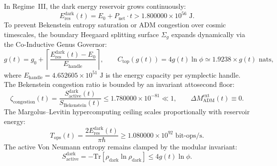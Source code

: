 \documentclass[11pt,onecolumn]{article}
\begin{document}
In Regime~III, the dark energy reservoir grows continuously:
\begin{equation}
E_{\text{res}}^{\text{dark}}(t) = E_0 + P_{\text{net}} \cdot t > 1.800000 \times 10^{56}\text{ J}.
\label{eq:v8_16}
\end{equation}
To prevent Bekenstein entropy saturation or ADM congestion over cosmic timescales, the boundary Heegaard splitting surface $\Sigma_g$ expands dynamically via the Co-Inductive Genus Governor:
\begin{equation}
g(t) = g_0 + \left\lceil \frac{E_{\text{res}}^{\text{dark}}(t) - E_0}{E_{\text{handle}}} \right\rceil, \qquad C_{\text{top}}(g(t)) = 4g(t)\ln\phi \simeq 1.9238 \times g(t)\text{ nats},
\label{eq:v8_17}
\end{equation}
where $E_{\text{handle}} = 4.652605 \times 10^{51}\text{ J}$ is the energy capacity per symplectic handle. The Bekenstein congestion ratio is bounded by an invariant attosecond floor:
\begin{equation}
\zeta_{\text{congestion}}(t) = \frac{S_{\text{active}}^{\text{dark}}(t)}{S_{\text{Bekenstein}}(t)} \le 1.780000 \times 10^{-81} \ll 1, \qquad \Delta M_{\text{ADM}}^{\text{ext}}(t) \equiv 0.
\label{eq:v8_18}
\end{equation}
The Margolus--Levitin hypercomputing ceiling scales proportionally with reservoir energy:
\begin{equation}
T_{\text{ops}}(t) = \frac{2 E_{\text{res}}^{\text{dark}}(t)}{\pi \hbar} \ge 1.080000 \times 10^{92}\text{ bit-ops/s}.
\label{eq:v8_19}
\end{equation}
The active Von Neumann entropy remains clamped by the modular invariant:
\begin{equation}
S_{\text{active}}^{\text{dark}} = -\mathrm{Tr}[\rho_{\text{dark}}\ln\rho_{\text{dark}}] \le 4g(t)\ln\phi.
\label{eq:v8_20}
\end{equation}
\end{document}
